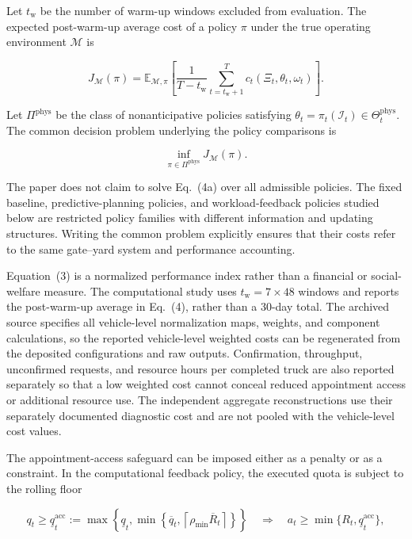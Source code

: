 \documentclass[preprint,12pt,authoryear,a4paper]{elsarticle}
\begin{document}
Let \(t_{\mathrm w}\) be the number of warm-up windows excluded from evaluation. The expected post-warm-up average cost of a policy \(\pi\) under the true operating environment \(\mathcal M\) is

\[
J_{\mathcal M}(\pi)
=\mathbb E_{\mathcal M,\pi}
\left[
\frac{1}{T-t_{\mathrm w}}
\sum_{t=t_{\mathrm w}+1}^{T}c_t(\Xi_t,\theta_t,\omega_t)
\right].
\tag{4}
\]

Let \(\Pi^{\mathrm{phys}}\) be the class of nonanticipative policies satisfying \(\theta_t=\pi_t(\mathcal I_t)\in\Theta_t^{\mathrm{phys}}\). The common decision problem underlying the policy comparisons is

\[
\inf_{\pi\in\Pi^{\mathrm{phys}}}J_{\mathcal M}(\pi).
\tag{4a}
\]

The paper does not claim to solve Eq.~(4a) over all admissible policies. The fixed baseline, predictive-planning policies, and workload-feedback policies studied below are restricted policy families with different information and updating structures. Writing the common problem explicitly ensures that their costs refer to the same gate--yard system and performance accounting.

Equation~(3) is a normalized performance index rather than a financial or social-welfare measure. The computational study uses \(t_{\mathrm w}=7\times48\) windows and reports the post-warm-up average in Eq.~(4), rather than a 30-day total. The archived source specifies all vehicle-level normalization maps, weights, and component calculations, so the reported vehicle-level weighted costs can be regenerated from the deposited configurations and raw outputs. Confirmation, throughput, unconfirmed requests, and resource hours per completed truck are also reported separately so that a low weighted cost cannot conceal reduced appointment access or additional resource use. The independent aggregate reconstructions use their separately documented diagnostic cost and are not pooled with the vehicle-level cost values.

The appointment-access safeguard can be imposed either as a penalty or as a constraint. In the computational feedback policy, the executed quota is subject to the rolling floor

\[
q_t\ge \underline q_t^{\mathrm{acc}}
:=\max\left\{\underline q_t,
\min\left\{\overline q_t,
\left\lceil\rho_{\min}\overline R_t\right\rceil
\right\}\right\}
\quad\Longrightarrow\quad
a_t\ge\min\{R_t,\underline q_t^{\mathrm{acc}}\},
\tag{5}
\]
\end{document}

